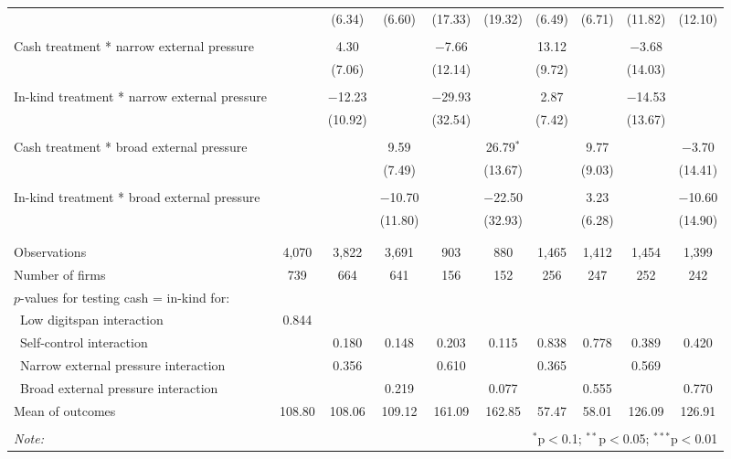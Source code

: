 \begin{table}[!htbp]
\begin{tabular}{@{\extracolsep{5pt}}lccccccccc}
  &  & (6.34) & (6.60) & (17.33) & (19.32) & (6.49) & (6.71) & (11.82) & (12.10) \\ 
  & & & & & & & & & \\ 
 Cash treatment * narrow external pressure &  & 4.30 &  & $-$7.66 &  & 13.12 &  & $-$3.68 &  \\ 
  &  & (7.06) &  & (12.14) &  & (9.72) &  & (14.03) &  \\ 
  & & & & & & & & & \\ 
 In-kind treatment * narrow external pressure &  & $-$12.23 &  & $-$29.93 &  & 2.87 &  & $-$14.53 &  \\ 
  &  & (10.92) &  & (32.54) &  & (7.42) &  & (13.67) &  \\ 
  & & & & & & & & & \\ 
 Cash treatment * broad external pressure &  &  & 9.59 &  & 26.79$^{*}$ &  & 9.77 &  & $-$3.70 \\ 
  &  &  & (7.49) &  & (13.67) &  & (9.03) &  & (14.41) \\ 
  & & & & & & & & & \\ 
 In-kind treatment * broad external pressure &  &  & $-$10.70 &  & $-$22.50 &  & 3.23 &  & $-$10.60 \\ 
  &  &  & (11.80) &  & (32.93) &  & (6.28) &  & (14.90) \\ 
  & & & & & & & & & \\ 
\hline \\[-1.8ex] 
Observations & 4,070 & 3,822 & 3,691 & 903 & 880 & 1,465 & 1,412 & 1,454 & 1,399 \\ 
Number of firms & 739 & 664 & 641 & 156 & 152 & 256 & 247 & 252 & 242 \\ 
$p$-values for testing cash = in-kind for: &  &  &  &  &  &  &  &  &  \\ 
\ Low digitspan interaction & 0.844 &  &  &  &  &  &  &  &  \\ 
\ Self-control interaction &  & 0.180 & 0.148 & 0.203 & 0.115 & 0.838 & 0.778 & 0.389 & 0.420 \\ 
\ Narrow external pressure interaction &  & 0.356 &  & 0.610 &  & 0.365 &  & 0.569 &  \\ 
\ Broad external pressure interaction &  &  & 0.219 &  & 0.077 &  & 0.555 &  & 0.770 \\ 
Mean of outcomes & 108.80 & 108.06 & 109.12 & 161.09 & 162.85 & 57.47 & 58.01 & 126.09 & 126.91 \\ 
\hline \\[-1.8ex] 
\textit{Note:}  & \multicolumn{9}{r}{$^{*}$p$<$0.1; $^{**}$p$<$0.05; $^{***}$p$<$0.01} \\ 
\end{tabular} 
\end{table} 
